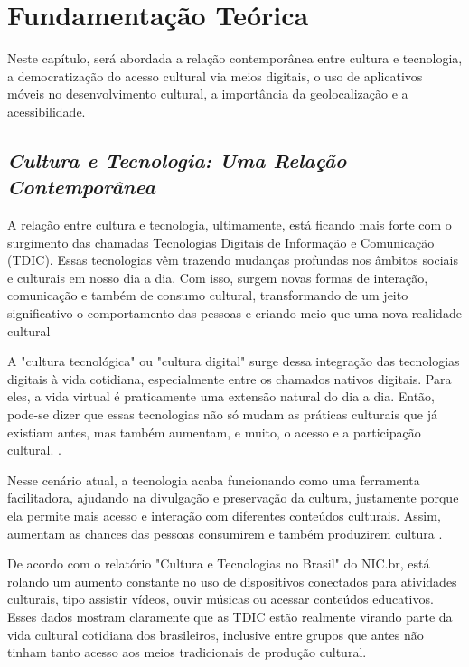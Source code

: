 \chapter{Fundamentação Teórica} \label{cha:fundamentacao}

Neste capítulo, será abordada a relação contemporânea entre cultura e tecnologia, a democratização do acesso cultural via meios digitais, o uso de aplicativos móveis no desenvolvimento cultural, a importância da geolocalização e a acessibilidade.

\section{\emph{Cultura e Tecnologia: Uma Relação Contemporânea}} 
\label{sec:fundamentacao:Cultura e Tecnologia: Uma Relação Contemporânea}

A relação entre cultura e tecnologia, ultimamente, está ficando mais forte com o surgimento das chamadas Tecnologias Digitais de Informação e Comunicação (TDIC). Essas tecnologias vêm trazendo mudanças profundas nos âmbitos sociais e culturais em nosso dia a dia. Com isso, surgem novas formas de interação, comunicação e também de consumo cultural, transformando de um jeito significativo o comportamento das pessoas e criando meio que uma nova realidade cultural \cite{barbosa2017tdic}

A "cultura tecnológica" ou "cultura digital" surge dessa integração das tecnologias digitais à vida cotidiana, especialmente entre os chamados nativos digitais. Para eles, a vida virtual é praticamente uma extensão natural do dia a dia. Então, pode-se dizer que essas tecnologias não só mudam as práticas culturais que já existiam antes, mas também aumentam, e muito, o acesso e a participação cultural. \cite{santos2021cultura-digital-bncc}.

Nesse cenário atual, a tecnologia acaba funcionando como uma ferramenta facilitadora, ajudando na divulgação e preservação da cultura, justamente porque ela permite mais acesso e interação com diferentes conteúdos culturais. Assim, aumentam as chances das pessoas consumirem e também produzirem cultura \cite{medeiros-cultura-tecnologica-nd}\cite{soster2021tecnologias}.

De acordo com o relatório "Cultura e Tecnologias no Brasil" do NIC.br, está rolando um aumento constante no uso de dispositivos conectados para atividades culturais, tipo assistir vídeos, ouvir músicas ou acessar conteúdos educativos. Esses dados mostram claramente que as TDIC estão realmente virando parte da vida cultural cotidiana dos brasileiros, inclusive entre grupos que antes não tinham tanto acesso aos meios tradicionais de produção cultural. \cite{nic-cultura-tecnologias-no-brasil}

